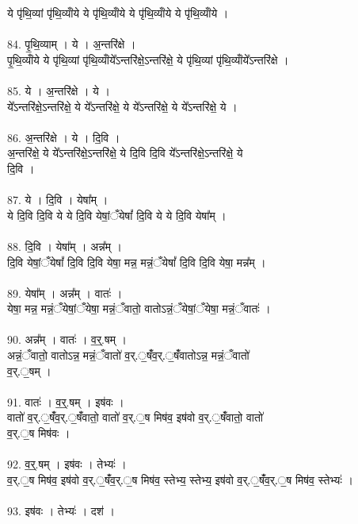 ये पृ॑थि॒व्यां पृ॑थि॒व्यांँये ये पृ॑थि॒व्यांँये ये पृ॑थि॒व्यांँये ये पृ॑थि॒व्यांँये ।\\
\\
84. पृ॒थि॒व्याम् । ये । अ॒न्तरि॑क्षे ।\\
पृ॒थि॒व्यांँये ये पृ॑थि॒व्यां पृ॑थि॒व्यांँये᳚ऽन्तरि॑क्षे॒ऽन्तरि॑क्षे॒ ये पृ॑थि॒व्यां पृ॑थि॒व्यांँये᳚ऽन्तरि॑क्षे ।\\
\\
85. ये । अ॒न्तरि॑क्षे । ये ।\\
ये᳚ऽन्तरि॑क्षे॒ऽन्तरि॑क्षे॒ ये ये᳚ऽन्तरि॑क्षे॒ ये ये᳚ऽन्तरि॑क्षे॒ ये ये᳚ऽन्तरि॑क्षे॒ ये ।\\
\\
86. अ॒न्तरि॑क्षे । ये । दि॒वि ।\\
अ॒न्तरि॑क्षे॒ ये ये᳚ऽन्तरि॑क्षे॒ऽन्तरि॑क्षे॒ ये दि॒वि दि॒वि ये᳚ऽन्तरि॑क्षे॒ऽन्तरि॑क्षे॒ ये\\
दि॒वि ।\\
\\
87. ये । दि॒वि । येषा᳚म् ।\\
ये दि॒वि दि॒वि ये ये दि॒वि येषां॒ँयेषां᳚ दि॒वि ये ये दि॒वि येषा᳚म् ।\\
\\
88. दि॒वि । येषा᳚म् । अन्न᳚म् ।\\
दि॒वि येषां॒ँयेषां᳚ दि॒वि दि॒वि येषा॒ मन्न॒ मन्नं॒ँयेषां᳚ दि॒वि दि॒वि येषा॒ मन्न᳚म् ।\\
\\
89. येषा᳚म् । अन्न᳚म् । वातः॑ ।\\
येषा॒ मन्न॒ मन्नं॒ँयेषां॒ँयेषा॒ मन्नं॒ँवातो॒ वातोऽन्नं॒ँयेषां॒ँयेषा॒ मन्नं॒ँवातः॑ ।\\
\\
90. अन्न᳚म् । वातः॑ । व॒र्॒.षम् ।\\
अन्नं॒ँवातो॒ वातोऽन्न॒ मन्नं॒ँवातो॑ व॒र्.॒षंँव॒र्.॒षंँवातोऽन्न॒ मन्नं॒ँवातो॑\\
व॒र्.॒षम् ।\\
\\
91. वातः॑ । व॒र्॒.षम् । इष॑वः ।\\
वातो॑ व॒र्.॒षंँव॒र्.॒षंँवातो॒ वातो॑ व॒र्.॒ष मिष॑व॒ इष॑वो व॒र्.॒षंँवातो॒ वातो॑\\
व॒र्.॒ष मिष॑वः ।\\
\\
92. व॒र्॒.षम् । इष॑वः । तेभ्यः॑ ।\\
व॒र्.॒ष मिष॑व॒ इष॑वो व॒र्.॒षंँव॒र्.॒ष मिष॑व॒ स्तेभ्य॒ स्तेभ्य॒ इष॑वो व॒र्.॒षंँव॒र्.॒ष मिष॑व॒ स्तेभ्यः॑ ।\\
\\
93. इष॑वः । तेभ्यः॑ । दश॑ ।\\
